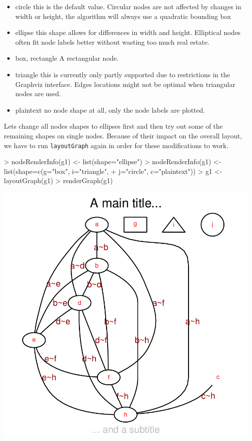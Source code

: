 \documentclass{article}
\newcommand{\Rfunction}[1]{{\texttt{#1}}}
\begin{document}
\begin{itemize}
\item{circle} {this is the default value. Circular nodes are not
    affected by changes in width or height, the algorithm will
    always use a quadratic bounding box}
\item{ellipse} {this shape allows for differences in width and
    height. Elliptical nodes often fit node labels better without
    wasting too much real estate. }
\item{box, rectangle} {A rectangular node.}
\item{triangle}  {this  is  currently  only partly  supported  due  to
    restrictions in the Graphviz  interface. Edges locations might not
    be optimal when triangular nodes are used.}
\item{plaintext} {no node shape at all, only the node labels are
    plotted.}
\end{itemize}

Lets change all nodes shapes to ellipses first and then try out some
of the remaining shapes on single nodes. Because of their impact on
the overall layout, we have to run \Rfunction{layoutGraph} again in
order for these modifications to work.
\begin{Schunk}
\begin{Sinput}
> nodeRenderInfo(g1) <- list(shape="ellipse")
> nodeRenderInfo(g1) <- list(shape=c(g="box", i="triangle", 
+                                    j="circle", c="plaintext"))
> g1 <- layoutGraph(g1)
> renderGraph(g1)
\end{Sinput}
\end{Schunk}
\includegraphics{newRgraphvizInterface-nshape}
\end{document}
